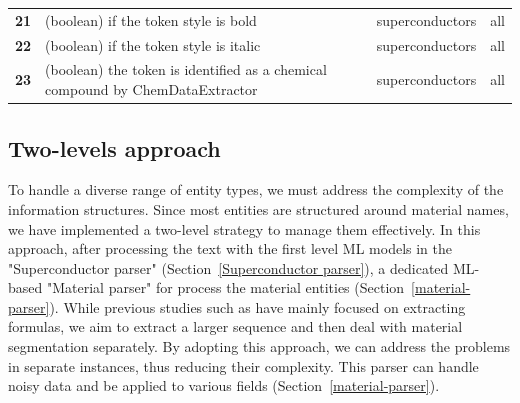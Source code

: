 \begin{table}
\begin{tabular}{l m{30em} c c}
        \textbf{21}   & (boolean) if the token style is bold & superconductors & all                   \\
        \textbf{22}   & (boolean) if the token style is italic & superconductors & all                   \\
        \textbf{23}   & (boolean) the token is identified as a chemical compound by ChemDataExtractor\cite{chemdataextractor}                                                                                                                                                    & superconductors & all                   \\
        \bottomrule
    \end{tabular}
    \label{tab:ML-model-features}
\end{table}

\subsection{Two-levels approach}
\label{sec:two-levels-approach}

To handle a diverse range of entity types, we must address the complexity of the information structures. 
Since most entities are structured around material names, we have implemented a two-level strategy to manage them effectively. 
In this approach, after processing the text with the first level ML models in the "Superconductor parser" (Section~\ref{Superconductor parser}), a dedicated ML-based "Material parser" for process the material entities (Section~\ref{material-parser}). 
While previous studies such as \cite{kononova2019text, court2020magnetic, dieb2015framework} have mainly focused on extracting formulas, we aim to extract a larger sequence and then deal with material segmentation separately. By adopting this approach, we can address the problems in separate instances, thus reducing their complexity. 
This parser can handle noisy data and be applied to various fields (Section~\ref{material-parser}).

